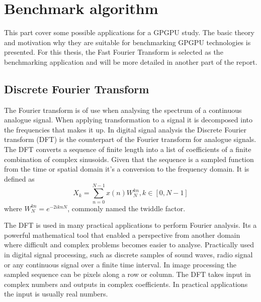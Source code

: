 \chapter{Benchmark algorithm}\label{cha:algorithms}
This part cover some possible applications for a GPGPU study. The basic theory and motivation why they are suitable for benchmarking GPGPU technologies is presented. For this thesis, the Fast Fourier Transform is selected as the benchmarking application and will be more detailed in another part of the report.

\newtheorem{thm}{Theorem}[chapter] %
\theoremstyle{definition}
\newtheorem{defn}[thm]{Definition} 

\section{Discrete Fourier Transform}
The Fourier transform is of use when analysing the spectrum of a continuous analogue signal. When applying transformation to a signal it is decomposed into the frequencies that makes it up. In digital signal analysis the Discrete Fourier transform (DFT) is the counterpart of the Fourier transform for analogue signals. The DFT converts a sequence of finite length into a list of coefficients of a finite combination of complex sinusoids. Given that the sequence is a sampled function from the time or spatial domain it's a conversion to the frequency domain. It is defined as
\begin{equation}
	X_k=\sum_{n=0}^{N-1}x(n)W_N^{kn}, k \in {[0, N-1]}	
\end{equation}
where $W_N^{kn}=e^{-2iknN}$, commonly named the twiddle factor\cite{Gentleman1966}.

The DFT is used in many practical applications to perform Fourier analysis. Its a powerful mathematical tool that enabled a perspective from another domain where difficult and complex problems becomes easier to analyse. Practically used in digital signal processing, such as discrete samples of sound waves, radio signal or any continuous signal over a finite time interval. In image processing the sampled sequence can be pixels along a row or column. The DFT takes input in complex numbers and outputs in complex coefficients. In practical applications the input is usually real numbers.

